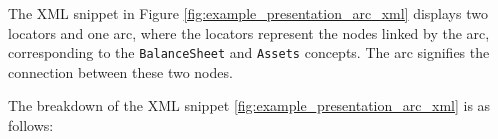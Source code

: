 



The XML snippet in Figure \ref{fig:example_presentation_arc_xml} displays two locators and one arc, where the locators represent the nodes linked by the arc, corresponding to the \texttt{BalanceSheet} and \texttt{Assets} concepts.
The arc signifies the connection between these two nodes.

The breakdown of the XML snippet \ref{fig:example_presentation_arc_xml} is as follows:

